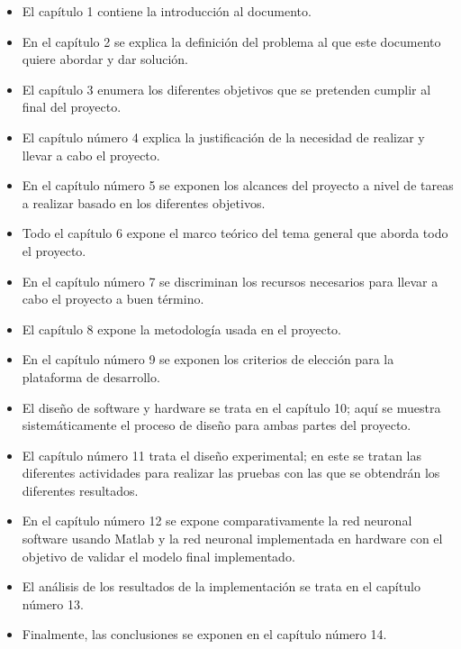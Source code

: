 \begin{itemize}
    \item El capítulo 1 contiene la introducción al documento.
    \item En el capítulo 2 se explica la definición del problema al que este documento quiere abordar y dar solución.
    \item El capítulo 3 enumera los diferentes objetivos que se pretenden cumplir al final del proyecto.
    \item El capítulo número 4 explica la justificación de la necesidad de realizar y llevar a cabo el proyecto.
    \item En el capítulo número 5 se exponen los alcances del proyecto a nivel de tareas a realizar basado en los diferentes objetivos.
    \item Todo el capítulo 6 expone el marco teórico del tema general que aborda todo el proyecto.
    \item En el capítulo número 7 se discriminan los recursos necesarios para llevar a cabo el proyecto a buen término.
    \item El capítulo 8 expone la metodología usada en el proyecto.
    \item En el capítulo número 9 se exponen los criterios de elección para la plataforma de desarrollo.
    \item El diseño de software y hardware se trata en el capítulo 10; aquí se muestra sistemáticamente el proceso de diseño para ambas partes del proyecto.
    \item El capítulo número 11 trata el diseño experimental; en este se tratan las diferentes actividades para realizar las pruebas con las que se obtendrán los diferentes resultados.
    \item En el capítulo número 12 se expone comparativamente la red neuronal software usando Matlab y la red neuronal implementada en hardware con el objetivo de validar el modelo final implementado.
    \item El análisis de los resultados de la implementación se trata en el capítulo número 13.
    \item Finalmente, las conclusiones se exponen en el capítulo número 14.
\end{itemize}
